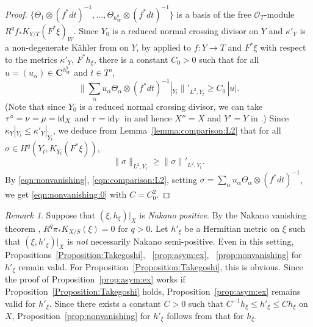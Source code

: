 \documentclass[amscd, leqno]{amsart}
\theoremstyle{plain}
\theoremstyle{definition}
\theoremstyle{remark}
\newtheorem{remark}[theorem]{Remark}
\newenvironment{pf}{\begin{proof}}{\end{proof}}
\begin{document}
\begin{pf}
$\{ \Theta_{1}\otimes(f^{*}dt)^{-1},\ldots, \Theta_{h_{W}^{q}} \otimes(f^{*}dt)^{-1}\}$ is a basis of the free ${\mathcal O}_{T}$-module 
$R^{q}f_{*}K_{Y/T}(F^{*}\xi)_{W}$.
Since $Y_{0}$ is a reduced normal crossing divisor on $Y$ and $\kappa'_{Y}$ is a non-degenerate K\"ahler from on $Y$, 
by \cite[Lemmas 4.7 and 4.8]{MourouganeTakayama09} applied to $f \colon Y \to T$ and $F^{*}\xi$ with respect to the metrics
$\kappa'_{Y}$, $F^{*}h_{\xi}$, there is a constant $C_{0}>0$ such that 
for all $u=(u_{\alpha})\in{\mathbf C}^{h_{W}^{q}}$ and $t\in T^{o}$,
\begin{equation}
\label{eqn:nonvanishing}
\| \sum_{\alpha} u_{\alpha} \Theta_{\alpha}\otimes (f^{*}dt)^{-1} |_{Y_{t}} \|'_{L^{2},Y_{t}} \geq C_{0}\,|u|.
\end{equation}
(Note that since $Y_{0}$ is a reduced normal crossing divisor, we can take $\tau^{\circ}=\nu=\mu={\rm id}_{X}$ and $\tau={\rm id}_{Y}$
in \cite[Sect.\,3.1]{MourouganeTakayama09} and hence $X''=X$ and $Y'=Y$ in \cite[Sect.\,4.3]{MourouganeTakayama09}.)
Since $\kappa_{Y}|_{Y_{t}} \leq \kappa'_{Y}|_{Y_{t}}$, 
we deduce from Lemma~\ref{lemma:comparison:L2} that for all $\sigma \in H^{q}(Y_{t}, K_{Y_{t}}(F^{*}\xi))$,
\begin{equation}
\label{eqn:comparison:L2}
\| \sigma \|_{L^{2}, Y_{t}} \geq \| \sigma \|'_{L^{2}, Y_{t}}.
\end{equation}
By \eqref{eqn:nonvanishing}, \eqref{eqn:comparison:L2}, setting $\sigma = \sum_{\alpha}u_{\alpha}\Theta_{\alpha}\otimes(f^{*}dt)^{-1}$,
we get \eqref{eqn:nonvanishing:0} with $C = C_{0}^{2}$.
\end{pf}


\begin{remark}
\label{remark:Nk:pos}
Suppose that $(\xi, h_{\xi})|_{X}$ is {\em Nakano positive}. By the Nakano vanishing theorem \cite[Cor.\,7.5]{Demailly12}, 
$R^{q}\pi_{*}K_{X/S}(\xi)=0$ for $q>0$. 
Let $h'_{\xi}$ be a Hermitian metric on $\xi$ such that $(\xi, h'_{\xi})|_{X}$ is {\em not} necessarily Nakano semi-positive. 
Even in this setting, Propositions~\ref{Proposition:Takegoshi}, ~\ref{prop:asym:ex}, ~\ref{prop:nonvanishing}
for $h'_{\xi}$ remain valid. 
For Proposition~\ref{Proposition:Takegoshi}, this is obvious. Since the proof of Proposition~\ref{prop:asym:ex} works 
if Proposition~\ref{Proposition:Takegoshi} holds, Proposition~\ref{prop:asym:ex} remains valid for $h'_{\xi}$. 
Since there exists a constant $C>0$ such that $C^{-1}h_{\xi} \leq h'_{\xi} \leq C h_{\xi}$ on $X$, 
Proposition~\ref{prop:nonvanishing} for $h'_{\xi}$ follows from that for $h_{\xi}$. 
\end{remark}
\end{document}
